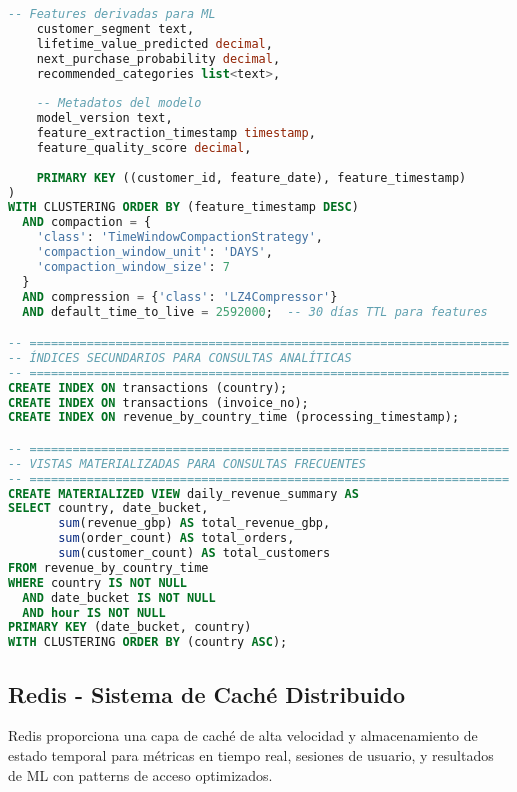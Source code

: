 \begin{lstlisting}[language=sql, caption=Definición del Keyspace y Tabla Principal de Analytics, label=lst:cassandra_schema]
    -- Features derivadas para ML
    customer_segment text,
    lifetime_value_predicted decimal,
    next_purchase_probability decimal,
    recommended_categories list<text>,
    
    -- Metadatos del modelo
    model_version text,
    feature_extraction_timestamp timestamp,
    feature_quality_score decimal,
    
    PRIMARY KEY ((customer_id, feature_date), feature_timestamp)
) 
WITH CLUSTERING ORDER BY (feature_timestamp DESC)
  AND compaction = {
    'class': 'TimeWindowCompactionStrategy',
    'compaction_window_unit': 'DAYS',
    'compaction_window_size': 7
  }
  AND compression = {'class': 'LZ4Compressor'}
  AND default_time_to_live = 2592000;  -- 30 días TTL para features

-- ===================================================================
-- ÍNDICES SECUNDARIOS PARA CONSULTAS ANALÍTICAS
-- ===================================================================
CREATE INDEX ON transactions (country);
CREATE INDEX ON transactions (invoice_no);
CREATE INDEX ON revenue_by_country_time (processing_timestamp);

-- ===================================================================
-- VISTAS MATERIALIZADAS PARA CONSULTAS FRECUENTES
-- ===================================================================
CREATE MATERIALIZED VIEW daily_revenue_summary AS
SELECT country, date_bucket, 
       sum(revenue_gbp) AS total_revenue_gbp,
       sum(order_count) AS total_orders,
       sum(customer_count) AS total_customers
FROM revenue_by_country_time
WHERE country IS NOT NULL 
  AND date_bucket IS NOT NULL 
  AND hour IS NOT NULL
PRIMARY KEY (date_bucket, country)
WITH CLUSTERING ORDER BY (country ASC);
\end{lstlisting}

\subsection{Redis - Sistema de Caché Distribuido}
\label{subsec:redis}

Redis proporciona una capa de caché de alta velocidad y almacenamiento de estado temporal para métricas en tiempo real, sesiones de usuario, y resultados de ML con patterns de acceso optimizados.

\vspace{0.3cm}

